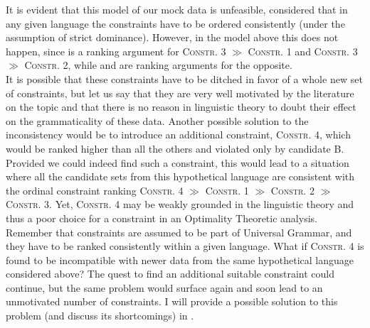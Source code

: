 It is evident that this model of our mock data is unfeasible, considered that in any given language the constraints have to be ordered consistently (under the assumption of strict dominance). However, in the model above this does not happen, since  is a ranking argument for \textsc{Constr. 3} $\gg$ \textsc{Constr. 1} and \textsc{Constr. 3} $\gg$ \textsc{Constr. 2}, while  and  are ranking arguments for the opposite.\\
It is possible that these constraints have to be ditched in favor of a whole new set of constraints, but let us say that they are very well motivated by the literature on the topic and that there is no reason in linguistic theory to doubt their effect on the grammaticality of these data. Another possible solution to the inconsistency would be to introduce an additional constraint, \textsc{Constr. 4}, which would be ranked higher than all the others and violated only by candidate B. Provided we could indeed find such a constraint, this would lead to a situation where all the candidate sets from this hypothetical language are consistent with the ordinal constraint ranking \textsc{Constr. 4} $\gg$ \textsc{Constr. 1} $\gg$ \textsc{Constr. 2} $\gg$ \textsc{Constr. 3}. Yet, \textsc{Constr. 4} may be weakly grounded in the linguistic theory and thus a poor choice for a constraint in an Optimality Theoretic analysis. Remember that constraints are assumed to be part of Universal Grammar, and they have to be ranked consistently within a given language. What if \textsc{Constr. 4} is found to be incompatible with newer data from the same hypothetical language considered above? The quest to find an additional suitable constraint could continue, but the same problem would surface again and soon lead to an unmotivated number of constraints. I will provide a possible solution to this problem (and discuss its shortcomings) in . %

